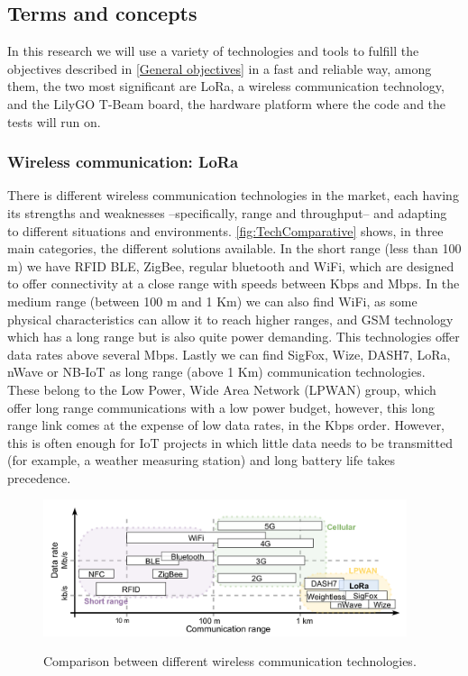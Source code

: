 \subsection{Terms and concepts}
In this research we will use a variety of technologies and tools to fulfill the objectives described in \autoref{General objectives} in a fast and reliable way, among them, the two most significant are LoRa, a wireless communication technology, and the LilyGO T-Beam board, the hardware platform where the code and the tests will run on.
\subsubsection{Wireless communication: LoRa}
There is different wireless communication technologies in the market, each having its strengths and weaknesses –specifically, range and throughput– and adapting to different situations and environments. \autoref{fig:TechComparative} shows, in three main categories, the different solutions available. In the short range (less than 100 m) we have RFID BLE, ZigBee, regular bluetooth and WiFi, which are designed to offer connectivity at a close range with speeds between Kbps and Mbps. In the medium range (between 100 m and 1 Km) we can also find WiFi, as some physical characteristics can allow it to reach higher ranges, and GSM technology which has a long range but is also quite power demanding. This technologies offer data rates above several Mbps. Lastly we can find SigFox, Wize, DASH7, LoRa, nWave or NB-IoT as long range (above 1 Km) communication technologies. These belong to the Low Power, Wide Area Network (LPWAN) group, which offer long range communications with a low power budget, however, this long range link comes at the expense of low data rates, in the Kbps order. However, this is often enough for IoT projects in which little data needs to be transmitted (for example, a weather measuring station) and long battery life takes precedence.
\begin{figure}[h]
        \centering
        \includegraphics[height=4cm]{Figures/TechComparative.png}
        \caption{Comparison between different wireless communication technologies.}
        \cite{StarOfStars}
        \label{fig:TechComparative}
\end{figure}


